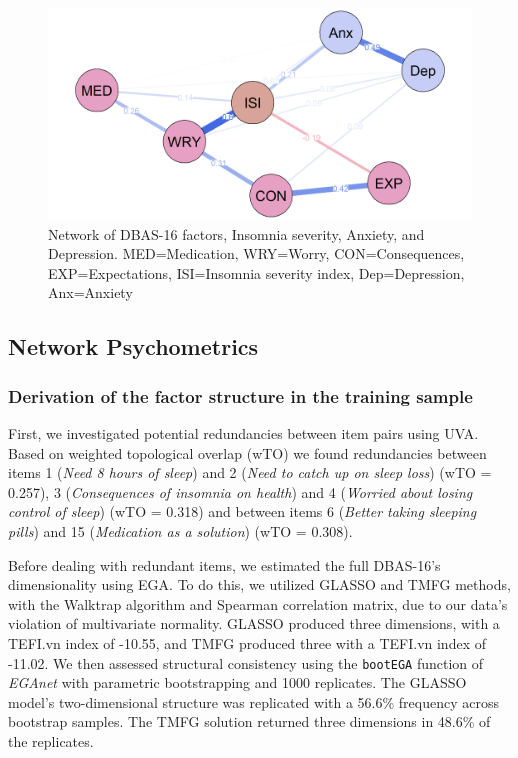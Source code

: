 \documentclass[
  12pt,
  twoside,
  openright,
  a4paper,
  chapter=TITLE,
  section=TITLE,
  brazil]{abntex2}
\begin{document}
\begin{figure}

{\centering \includegraphics{img/network-conv-plot.png}

}

\caption{\label{fig-network-conv}Network of DBAS-16 factors, Insomnia
severity, Anxiety, and Depression. MED=Medication, WRY=Worry,
CON=Consequences, EXP=Expectations, ISI=Insomnia severity index,
Dep=Depression, Anx=Anxiety}

\end{figure}

\hypertarget{network-psychometrics-1}{%
\subsection{Network Psychometrics}\label{network-psychometrics-1}}

\hypertarget{derivation-of-the-factor-structure-in-the-training-sample}{%
\subsubsection{Derivation of the factor structure in the training
sample}\label{derivation-of-the-factor-structure-in-the-training-sample}}

First, we investigated potential redundancies between item pairs using
UVA. Based on weighted topological overlap (wTO) we found redundancies
between items 1 (\emph{Need 8 hours of sleep}) and 2 (\emph{Need to
catch up on sleep loss}) (wTO = 0.257), 3 (\emph{Consequences of
insomnia on health}) and 4 (\emph{Worried about losing control of
sleep}) (wTO = 0.318) and between items 6 (\emph{Better taking sleeping
pills}) and 15 (\emph{Medication as a solution}) (wTO = 0.308).

Before dealing with redundant items, we estimated the full DBAS-16's
dimensionality using EGA. To do this, we utilized GLASSO and TMFG
methods, with the Walktrap algorithm and Spearman correlation matrix,
due to our data's violation of multivariate normality. GLASSO produced
three dimensions, with a TEFI.vn index of -10.55, and TMFG produced
three with a TEFI.vn index of -11.02. We then assessed structural
consistency using the \texttt{bootEGA} function of \emph{EGAnet} with
parametric bootstrapping and 1000 replicates. The GLASSO model's
two-dimensional structure was replicated with a 56.6\% frequency across
bootstrap samples. The TMFG solution returned three dimensions in 48.6\%
of the replicates.
\end{document}
